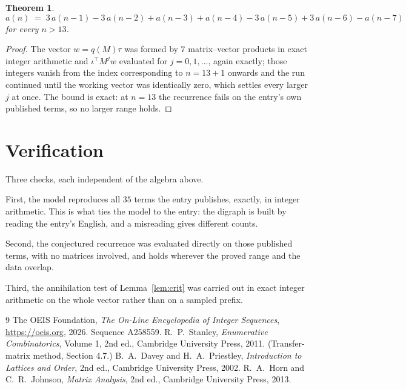\documentclass[11pt,a4paper]{article}
\theoremstyle{plain}
\newtheorem{theorem}{Theorem}
\theoremstyle{definition}
\begin{document}
\begin{theorem}
\[
a(n)\;=\;3\,a(n-1) - 3\,a(n-2) + a(n-3) + a(n-4) - 3\,a(n-5) + 3\,a(n-6) - a(n-7)
\]
for every $n>13$.
\end{theorem}

\begin{proof}
The vector $w=q(M)\tau$ was formed by $7$ matrix--vector products in exact integer
arithmetic and $\iota^{\!\top}M^{j}w$ evaluated for $j=0,1,\dots$, again exactly; those
integers vanish from the index corresponding to $n=13+1$ onwards and the run continued
until the working vector was identically zero, which settles every larger $j$ at once. The bound is exact: at $n=13$ the recurrence fails on the entry's own published terms, so no larger range holds.
\end{proof}

\section{Verification}

Three checks, each independent of the algebra above.

First, the model reproduces all $35$ terms the entry publishes, exactly, in integer
arithmetic. This is what ties the model to the entry: the digraph is built by reading the
entry's English, and a misreading gives different counts.

Second, the conjectured recurrence was evaluated directly on those published terms, with no
matrices involved, and holds wherever the proved range and the data overlap.

Third, the annihilation test of Lemma~\ref{lem:crit} was carried out in exact integer
arithmetic on the whole vector rather than on a sampled prefix.

\begin{thebibliography}{9}
 The OEIS Foundation, \emph{The On-Line Encyclopedia of Integer
Sequences}, \url{https://oeis.org}, 2026. Sequence A258559.
 R.~P.~Stanley, \emph{Enumerative Combinatorics}, Volume 1, 2nd ed.,
Cambridge University Press, 2011. (Transfer-matrix method, Section 4.7.)
 B.~A.~Davey and H.~A.~Priestley, \emph{Introduction to Lattices and
Order}, 2nd ed., Cambridge University Press, 2002.
 R.~A.~Horn and C.~R.~Johnson, \emph{Matrix Analysis}, 2nd ed., Cambridge
University Press, 2013.
\end{thebibliography}
\end{document}
